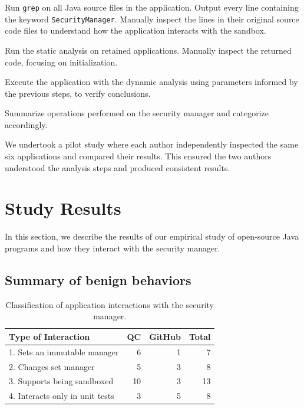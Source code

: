 \documentclass{sig-alternate}
\begin{document}
\begin{flushenum}\setlength{\parskip}{0pt}
  \setlength{\parsep}{0pt}
  \setlength{\itemsep}{0pt}
\item Run \texttt{grep} on all Java source files in the application.
Output every line containing the keyword \texttt{SecurityManager}.
Manually inspect the lines in their original source code files to understand
how the application interacts with the sandbox.
\item Run the static analysis on retained applications. Manually inspect the
  returned code, focusing on initialization. 
\item Execute the application with the dynamic analysis using parameters
  informed by the previous steps, 
to verify conclusions.
\item Summarize operations performed
on the security manager and categorize accordingly.
\end{flushenum}

We undertook a pilot study where each author
independently inspected the same six applications and compared their
results. This ensured the two authors understood the analysis steps 
and produced consistent results.


\section{Study Results}\label{sec:Study-results}

In this section, we describe the results of our empirical study of open-source
Java programs and how they interact with the security manager. 

\subsection{Summary of benign behaviors}\label{sub:Evaluation-of-the-hypotheses}


\begin{table}
\caption{Classification of application
  interactions \label{tab:Classification-of-Application}
with the security manager.}
\begin{tabular}{lrrr}
\toprule 
Type of Interaction & QC & GitHub & Total\tabularnewline
\midrule
1. Sets an immutable manager & 6 & 1 & 7\tabularnewline
2. Changes set manager & 5 & 3 & 8\tabularnewline
3. Supports being sandboxed & 10 & 3 & 13\tabularnewline
4. Interacts only in unit tests & 3 & 5 & 8\tabularnewline
\bottomrule
\end{tabular}
\end{table}
\end{document}
